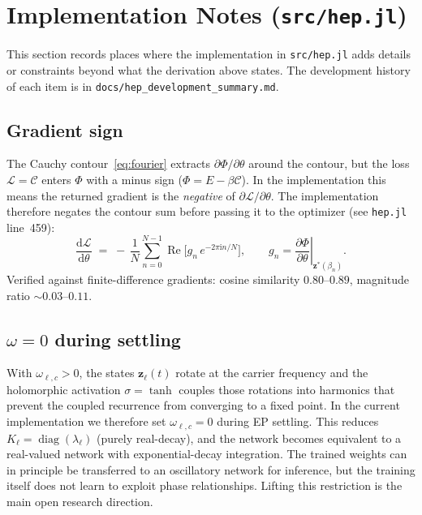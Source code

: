 \documentclass[11pt]{article}
\newcommand{\im}{\mathrm{i}}
\newcommand{\dd}{\mathrm{d}}
\theoremstyle{definition}
\DeclareMathOperator{\diag}{diag}
\DeclareMathOperator{\Real}{Re}
\begin{document}
\section{Implementation Notes (\texttt{src/hep.jl})}\label{sec:impl}

This section records places where the implementation in
\texttt{src/hep.jl} adds details or constraints beyond what the
derivation above states.  The development history of each item is in
\texttt{docs/hep\_development\_summary.md}.

\subsection{Gradient sign}

The Cauchy contour~\eqref{eq:fourier} extracts
$\partial\Phi/\partial\theta$ around the contour, but the loss
$\mathcal{L}=\mathcal{C}$ enters $\Phi$ with a minus sign
($\Phi = E - \beta\mathcal{C}$).  In the implementation this means the
returned gradient is the \emph{negative} of $\partial\mathcal{L}/\partial\theta$.
The implementation therefore negates the contour sum before passing it
to the optimizer (see \texttt{hep.jl} line~459):
\[
  \frac{\dd\mathcal{L}}{\dd\theta}
  \;=\;
  -\,\frac{1}{N}\sum_{n=0}^{N-1}
    \Real\!\bigl[
      g_n\,e^{-2\pi\im n/N}
    \bigr],
  \qquad
  g_n = \left.\frac{\partial\Phi}{\partial\theta}\right|_{\bm{z}^*(\beta_n)}.
\]
Verified against finite-difference gradients: cosine similarity
$0.80$--$0.89$, magnitude ratio $\sim 0.03$--$0.11$.

\subsection{$\omega = 0$ during settling}

With $\omega_{\ell,c}>0$, the states $\bm{z}_\ell(t)$ rotate at the
carrier frequency and the holomorphic activation $\sigma=\tanh$ couples
those rotations into harmonics that prevent the coupled recurrence
from converging to a fixed point.  In the current implementation we
therefore set $\omega_{\ell,c}=0$ during EP settling.  This reduces
$K_\ell=\diag(\lambda_\ell)$ (purely real-decay), and the network
becomes equivalent to a real-valued network with exponential-decay
integration.  The trained weights can in principle be transferred to
an oscillatory network for inference, but the training itself does
not learn to exploit phase relationships.  Lifting this restriction
is the main open research direction.
\end{document}
